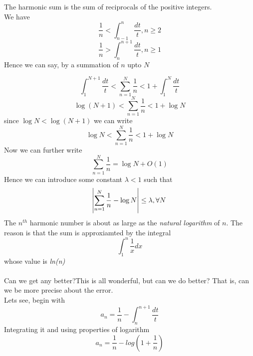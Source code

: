 \documentclass[2pt]{article}
\begin{document}
The harmonic sum is the sum of reciprocals of the positive integers.
\\
We have
\begin{equation}
\frac{1}{n} < \int_{n-1}^{n} \frac{dt}{t} , n \geq 2\nonumber
\end{equation}
\begin{equation}
\frac{1}{n} > \int_{n}^{n+1} \frac{dt}{t} , n \geq 1\nonumber
\end{equation}
Hence we can say, by a summation of $n$ upto $N$

\begin{equation}
\int_{1}^{N+1} \frac{dt}{t} < \sum_{n=1}^{N} \frac{1}{n} < 1 + \int_{1}^{N} \frac{dt}{t}\nonumber
\end{equation}
\pagebreak
\begin{equation}
\log{(N+1)} < \sum_{n=1}^{N} \frac{1}{n} < 1 + \log{N}\nonumber
\end{equation}
since $\log{N} < \log{(N+1)}$ we can write\\
\begin{equation}
\log{N} < \sum_{n=1}^{N} \frac{1}{n} < 1 + \log{N}\nonumber
\end{equation}
Now we can further write
\begin{equation}
\sum_{n=1}^{N} \frac{1}{n} = \log{N} + O(1)\nonumber
\end{equation}
Hence we can introduce some constant $\lambda < 1$ such that
\begin{equation}
\abs{\sum_{n=1}^{N} \frac{1}{n} - \log{N}} \leq \lambda , \forall N\nonumber
\end{equation}
The $n^{th}$ harmonic number is about as large as the \emph{natural logarithm} of $n$. The reason is that the sum is approxiamted by the integral
\begin{equation}
\int_{1}^{n} \frac{1}{x} dx\nonumber
\end{equation}
whose value is \emph{ln(n)} \\
\\
Can we get any better?This is all wonderful, but can we do better? That is, can we be more precise about the
error. \\ Lets see, begin with
\begin{equation}
a_{n} = \frac{1}{n}-\int_{n}^{n+1}\frac{dt}{t} \nonumber
\end{equation}
Integrating it and using properties of logarithm
\begin{equation}
a_{n}=\frac{1}{n}-log{(1+\frac{1}{n})}
\end{equation}
\end{document}
